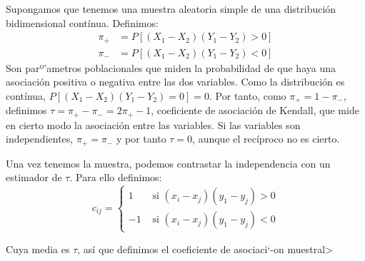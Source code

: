 
Supongamos que tenemos una muestra aleatoria simple de una distribuci\'on bidimensional cont\'inua. Definimos:
\begin{align*}
\pi_{+}&=P[(X_1-X_2)(Y_1-Y_2)>0] \\
\pi_{-}&=P[(X_1-X_2)(Y_1-Y_2)<0] 
\end{align*}
Son parº'ametros poblacionales que miden la probabilidad de que haya una asociaci\'on positiva o negativa entre las dos variables. Como la distribuci\'on es cont\'inua, $P[(X_1-X_2)(Y_1-Y_2)=0]=0$. Por tanto, como $\pi_+=1-\pi_-$, definimos $\tau=\pi_+-\pi_-=2\pi_+-1$, coeficiente de asociaci\'on de Kendall, que mide en cierto modo la asociaci\'on entre las variables. Si las variables son independientes, $\pi_+=\pi_-$ y por tanto $\tau=0$, aunque el rec\'iproco no es cierto.

Una vez tenemos la muestra, podemos contrastar la independencia con un estimador de $\tau$. Para ello definimos:
\[c_{ij}=\left\{\begin{matrix}
1 & \text{  si  } (x_i-x_j)(y_1-y_j)>0 \\
-1 & \text{  si  } (x_i-x_j)(y_1-y_j)<0 
\end{matrix}\right.\]

Cuya media es $\tau$, as\'i que definimos el coeficiente de asociaci`-on muestral>

